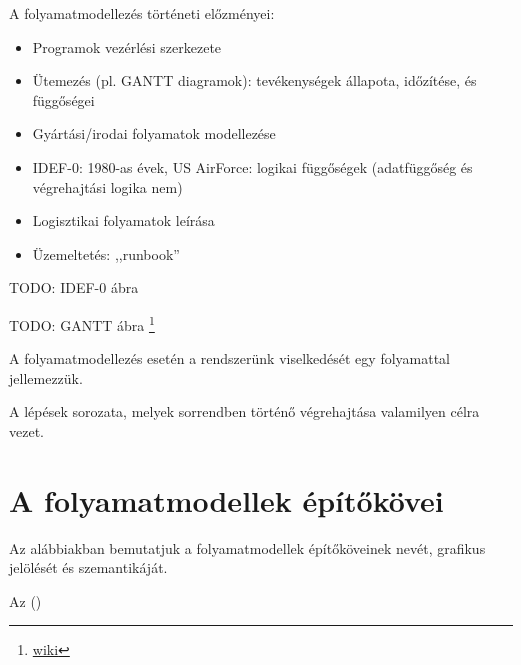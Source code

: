\begin{megjegyzes}
A folyamatmodellezés történeti előzményei:

\begin{itemize}
	\item Programok vezérlési szerkezete
	\item Ütemezés (pl. GANTT diagramok): tevékenységek állapota, időzítése, és függőségei
	\item Gyártási/irodai folyamatok modellezése
	\item IDEF-0: 1980-as évek, US AirForce: logikai függőségek (adatfüggőség és végrehajtási logika nem)
	\item Logisztikai folyamatok leírása
	\item Üzemeltetés: ,,runbook''
\end{itemize}

TODO: IDEF-0 ábra

TODO: GANTT ábra \footnote{\url{wiki}}
\end{megjegyzes}

A folyamatmodellezés esetén a rendszerünk viselkedését egy folyamattal jellemezzük.

\begin{definicio}
	A  lépések sorozata, melyek sorrendben történő végrehajtása valamilyen célra vezet.
\end{definicio}	

\section{A folyamatmodellek építőkövei}

Az alábbiakban bemutatjuk a folyamatmodellek építőköveinek nevét, grafikus jelölését és szemantikáját.

\begin{definicio}
	 
\end{definicio}

\begin{megjegyzes}
	Az  ()
\end{megjegyzes}

\begin{definicio}
\end{definicio}

\begin{definicio}
\end{definicio}

